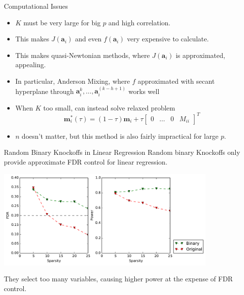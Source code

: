\documentclass{beamer}
\begin{document}
\begin{frame}{Computational Issues}
    \begin{itemize}
        \item $K$ must be very large for big $p$ and high correlation.
        \item This makes $J\left( \mathbf a_i\right)$ and even $f\left(\mathbf a_i\right)$ very expensive to calculate.
        \item This makes quasi-Newtonian methods, where $J\left( \mathbf a_i\right)$ is approximated, appealing.
        \item In particular, Anderson Mixing, where $f$ approximated with secant hyperplane through $\mathbf a_i^{k},\ldots,\mathbf a_i^{(k-h+1)}$ works well
        \item When $K$ too small, can instead solve relaxed problem
    \[\mathbf m_i^*(\tau) = (1-\tau)\mathbf m_i + \tau \left[ \begin{array}{cccc} 0 & \ldots & 0 & M_{ii} \end{array} \right]^T \]
        \item $n$ doesn't matter, but this method is also fairly impractical for large $p$.
    \end{itemize}
\end{frame}

\begin{frame}{Random Binary Knockoffs in Linear Regression}
    Random binary Knockoffs only provide approximate FDR control for linear regression. 
    \begin{center}
        \includegraphics[width=11cm]{images/lasso_FDR_power_50}
    \end{center}
    They select too many variables, causing higher power at the expense of FDR control.
\end{frame}
\end{document}
